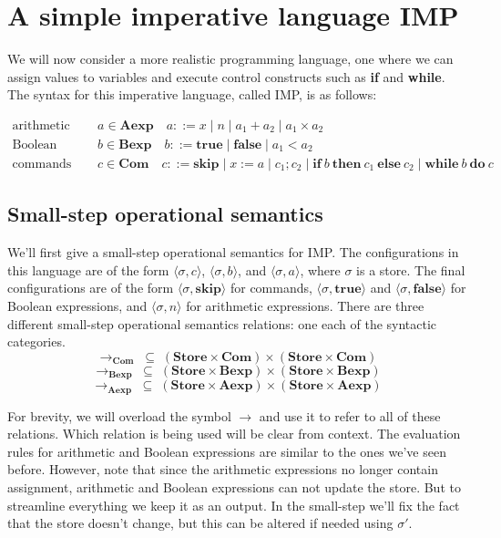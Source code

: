 % 
\section{A simple imperative language IMP}

We will now consider a more realistic programming language, one where we can assign values to
variables and execute control constructs such as \textbf{if} and \textbf{while}. The syntax for
this imperative language, called IMP, is as follows:

\begin{align*}
\text{arithmetic expressions} \quad & a \in \mathbf{Aexp} \quad a ::= x \mid n \mid a_1 + a_2
\mid a_1 \times a_2 \\
\text{Boolean expressions} \quad & b \in \mathbf{Bexp} \quad b ::= \mathbf{true} \mid
\mathbf{false} \mid a_1 < a_2 \\
\text{commands} \quad & c \in \mathbf{Com} \quad c ::= \mathbf{skip} \mid x := a \mid c_1; c_2
\mid \mathbf{if}\ b\ \mathbf{then}\ c_1\ \mathbf{else}\ c_2 \mid \mathbf{while}\ b\
\mathbf{do}\ c
\end{align*}

\subsection{Small-step operational semantics}

We'll first give a small-step operational semantics for IMP. The configurations in this
language are of the form $\langle \sigma, c \rangle$, $\langle \sigma, b \rangle$, and $\langle
\sigma, a \rangle$, where $\sigma$ is a store. The final configurations are of the form
$\langle \sigma, \mathbf{skip} \rangle$ for commands, $\langle \sigma, \mathbf{true} \rangle$
and $\langle \sigma, \mathbf{false} \rangle$ for Boolean expressions, and $\langle \sigma, n
\rangle$ for arithmetic expressions. There are three different small-step operational
semantics relations: one each of the syntactic categories.
\[
\to_{\mathbf{Com}} \; \subseteq \; (\mathbf{Store} \times \mathbf{Com}) \times (\mathbf{Store}
\times \mathbf{Com})
\]
\[
\to_{\mathbf{Bexp}} \; \subseteq \; (\mathbf{Store} \times \mathbf{Bexp}) \times
(\mathbf{Store} \times \mathbf{Bexp})
\]
\[
\to_{\mathbf{Aexp}} \; \subseteq \; (\mathbf{Store} \times \mathbf{Aexp}) \times
(\mathbf{Store} \times \mathbf{Aexp})
\]

For brevity, we will overload the symbol $\to$ and use it to refer to all of these relations.
Which relation is being used will be clear from context. The evaluation rules for arithmetic
and Boolean expressions are similar to the ones we've seen before. However, note that since the
arithmetic expressions no longer contain assignment, arithmetic and Boolean expressions can not
update the store. But to streamline everything we keep it as an output. In the small-step we'll fix the fact that the store doesn't change, but this can be altered if needed using $ \sigma' $.

